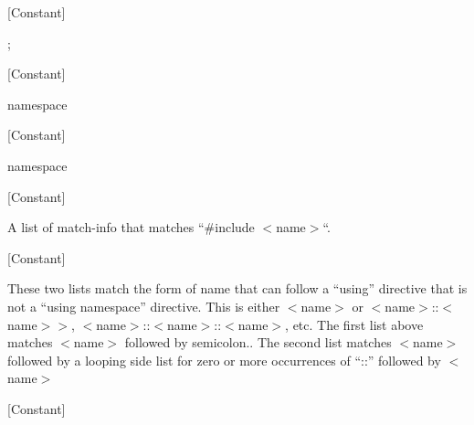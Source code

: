 \vspace{1em}
\noindent
{}
\usebox{\funcname}
 \hfill [Constant]

\begin{doc-string}
;
\end{doc-string}

\vspace{1em}
\noindent
{}
\usebox{\funcname}
 \hfill [Constant]

\begin{doc-string}
namespace
\end{doc-string}

\vspace{1em}
\noindent
{}
\usebox{\funcname}
 \hfill [Constant]

\begin{doc-string}
namespace
\end{doc-string}

\vspace{1em}
\noindent
{}
\usebox{\funcname}
 \hfill [Constant]

\begin{doc-string}
A list of match-info that matches ``\#include $<$name$>$``.
\end{doc-string}

\vspace{1em}
\noindent
{}
\usebox{\funcname}
 \hfill [Constant]

\begin{doc-string}
These two lists match the form of name that can follow a ``using'' directive
that is not a ``using namespace'' directive.  This is either $<$name$>$ or
$<$name$>$::$<$name$>$$>$, $<$name$>$::$<$name$>$::$<$name$>$, etc.  The first list above matches
$<$name$>$ followed by semicolon..  The second list matches $<$name$>$ followed
by a looping side list for zero or more occurrences of ``::'' followed by $<$name$>$
\end{doc-string}

\vspace{1em}
\noindent
{}
\usebox{\funcname}
 \hfill [Constant]

